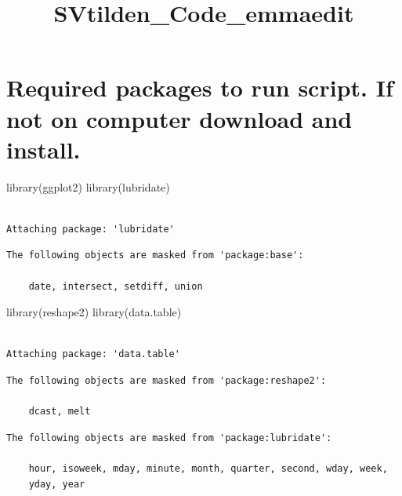 \documentclass[
  letterpaper,
  DIV=11,
  numbers=noendperiod]{scrartcl}
\title{SVtilden\_Code\_emmaedit}
\author{}
\date{}
\newenvironment{Shaded}{\begin{snugshade}}{\end{snugshade}}
\newcommand{\FunctionTok}[1]{\textcolor[rgb]{0.28,0.35,0.67}{#1}}
\newcommand{\NormalTok}[1]{\textcolor[rgb]{0.00,0.23,0.31}{#1}}
\begin{document}
\maketitle


\section{Required packages to run script. If not on computer download
and
install.}\label{required-packages-to-run-script.-if-not-on-computer-download-and-install.}

\begin{Shaded}
\begin{Highlighting}[]
\FunctionTok{library}\NormalTok{(ggplot2)}
\FunctionTok{library}\NormalTok{(lubridate)}
\end{Highlighting}
\end{Shaded}

\begin{verbatim}

Attaching package: 'lubridate'
\end{verbatim}

\begin{verbatim}
The following objects are masked from 'package:base':

    date, intersect, setdiff, union
\end{verbatim}

\begin{Shaded}
\begin{Highlighting}[]
\FunctionTok{library}\NormalTok{(reshape2)}
\FunctionTok{library}\NormalTok{(data.table)}
\end{Highlighting}
\end{Shaded}

\begin{verbatim}

Attaching package: 'data.table'
\end{verbatim}

\begin{verbatim}
The following objects are masked from 'package:reshape2':

    dcast, melt
\end{verbatim}

\begin{verbatim}
The following objects are masked from 'package:lubridate':

    hour, isoweek, mday, minute, month, quarter, second, wday, week,
    yday, year
\end{verbatim}
\end{document}
